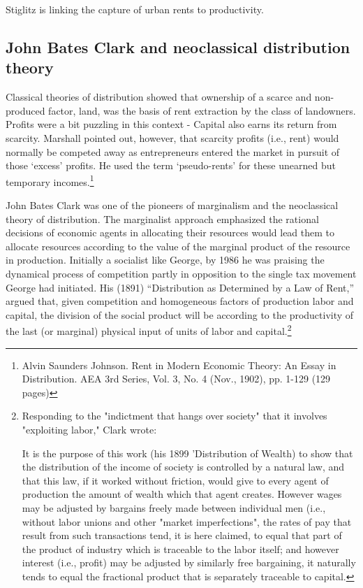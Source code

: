 Stiglitz is linking the capture of urban rents to productivity.

  \subsection{John Bates Clark and neoclassical distribution theory}
  Classical theories of distribution showed that ownership of a scarce and non-produced factor, land, was the  basis of rent extraction by the class of landowners. Profits were a bit puzzling in this context - Capital also earns its return from scarcity. Marshall pointed out, however, that scarcity profits (i.e., rent) would normally be competed away  as entrepreneurs entered the market in pursuit of those `excess' profits. He used the term `pseudo-rents' for these unearned but temporary incomes.\footnote{Alvin Saunders Johnson. Rent in Modern Economic Theory: An Essay in Distribution. AEA 3rd Series, Vol. 3, No. 4 (Nov., 1902), pp. 1-129 (129 pages)}

 John Bates Clark was one of the pioneers of marginalism and the neoclassical theory of  distribution.  The marginalist approach emphasized the rational decisions of economic agents in allocating their resources would lead them to allocate resources according to the value of the marginal product of the resource in production.  Initially a socialist like George, by 1986 he was praising the dynamical process of competition partly in opposition to the single tax movement George had initiated.  His (1891) ``Distribution as Determined by a Law of Rent,'' argued that, given  competition and homogeneous factors of production labor and capital, the division of the social product will be according to the productivity of the last (or marginal) physical input of units of labor and capital.\footnote{Responding to the "indictment that hangs over society" that it involves "exploiting labor," Clark wrote:

    It is the purpose of this work (his 1899 'Distribution of Wealth) to show that the distribution of the income of society is controlled by a natural law, and that this law, if it worked without friction, would give to every agent of production the amount of wealth which that agent creates. However wages may be adjusted by bargains freely made between individual men (i.e., without labor unions and other "market imperfections", the rates of pay that result from such transactions tend, it is here claimed, to equal that part of the product of industry which is traceable to the labor itself; and however interest (i.e., profit) may be adjusted by similarly free bargaining, it naturally tends to equal the fractional product that is separately traceable to capital.} 

